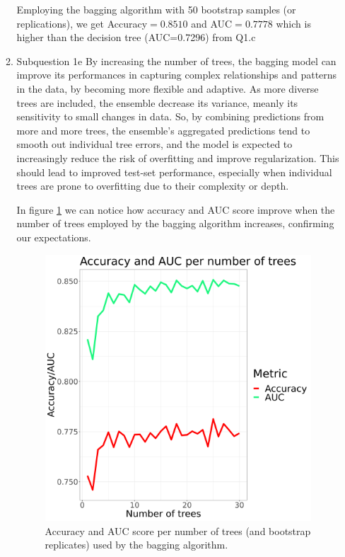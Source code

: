 \documentclass[12pt,twoside]{article}
\begin{document}
\begin{enumerate}
\begin{enumerate}
	Employing the bagging algorithm with 50 bootstrap samples (or replications), we get Accuracy$=0.8510$ and AUC$=0.7778$ which is higher than the decision tree (AUC=0.7296) from Q1.c
	
	\item Subquestion 1e 
	By increasing the number of trees, the bagging model can improve its performances in capturing complex relationships and patterns in the data, by becoming more flexible and adaptive. As more diverse trees are included, the ensemble decrease its variance, meanly its sensitivity to small changes in data. So, by combining predictions from more and more trees, the ensemble's aggregated predictions tend to smooth out individual tree errors, and the model is expected to increasingly reduce the risk of overfitting and improve regularization. This should lead to improved test-set performance, especially when individual trees are prone to overfitting due to their complexity or depth.

	In figure \ref{fig:accuracy_auc_per_num_trees} we can notice how accuracy and AUC score improve when the number of trees employed by the bagging algorithm increases, confirming our expectations.
	\begin{figure}[H]\centering
		\includegraphics[width=12cm]{accuracy_auc_per_num_trees}
		\caption{Accuracy and AUC score per number of trees (and bootstrap replicates) used by the bagging algorithm.}
		\label{fig:accuracy_auc_per_num_trees}
	\end{figure}


\end{enumerate}
\end{enumerate}
\end{document}
